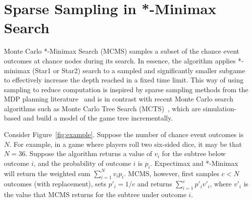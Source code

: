 \documentclass{article}
\begin{document}

\section{Sparse Sampling in *-Minimax Search}

Monte Carlo *-Minimax Search (MCMS) samples a subset of the chance event outcomes at chance nodes
during its search. In essence, the algorithm applies *-minimax (Star1 or Star2) search to a sampled 
and significantly smaller subgame to effectively increase the depth reached in a fixed time limit. 
This way of using sampling to reduce computation is inspired by sparse sampling methods from the 
MDP planning literature~\cite{kearns99} and is in contrast with recent Monte Carlo search algorithms such as Monte 
Carlo Tree Search (MCTS)~\cite{Coulom07Efficient}, which are simulation-based and build a model of 
the game tree incrementally.

Consider Figure~\ref{fig:example}. Suppose the number of chance event outcomes is $N$. 
For example, in a game where players roll two six-sided dice, it may be that $N = 36$.  
Suppose the algorithm returns a value of $v_i$ for the subtree below outcome $i$, and the probability of outcome
$i$ is $p_i$. Expectimax and *-Minimax will return the weighted sum $\sum_{i = 1}^N v_i p_i$. MCMS, however, 
first samples $c < N$ outcomes (with replacement), sets $p'_i = 1/c$ and returns $\sum_{i = 1}^c p'_i v'_i$, 
where $v'_i$ is the value that MCMS returns for the subtree under outcome $i$. 
\end{document}

